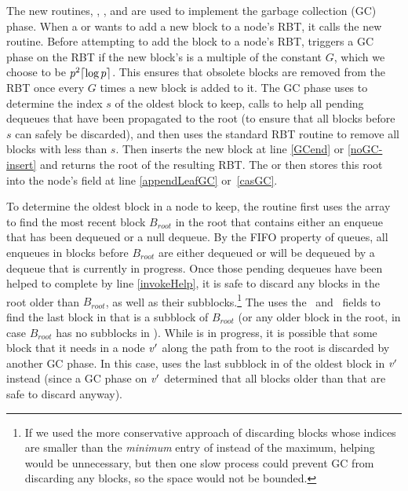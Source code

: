 The new routines, , ,  and  are
used to implement the garbage collection (GC) phase.
When a  or  wants to add a new block to a node's  RBT,
it calls the new  routine.
Before attempting to add the block to a node's RBT,  triggers a GC phase on the RBT if 
the new block's  is a multiple of the constant $G$, which we choose to be $p^2\lceil \log p \rceil$.
This ensures that obsolete blocks are removed from the RBT once every $G$ times a new block is added to it.
The GC phase uses  to determine the index $s$ of the oldest block to keep,
calls  to help all pending dequeues that have been propagated to the root
(to ensure that all blocks before $s$ can safely be discarded), and then
uses the standard RBT  routine \cite{Tar83}
to remove all blocks with  less than $s$.
Then 
inserts the new block at line \ref{GCend} or \ref{noGC-insert}
and returns the root of the resulting RBT.
The  or  then stores this root into the node's  field at line 
 \ref{appendLeafGC} or~\ref{casGC}.

To determine the oldest block in a node  to keep, the  routine  first
uses the  array to
find the most recent block $B_{root}$ in the root that contains either an enqueue that has been dequeued
or a null dequeue.  By the FIFO property of queues, all enqueues in blocks before $B_{root}$ are either
dequeued or will be dequeued by a dequeue that is currently in progress.  Once those pending dequeues have been
helped to complete by line \ref{invokeHelp},
it is safe to discard any blocks in the root older than $B_{root}$, as well
as their subblocks.\footnote{If we used the more conservative approach of discarding blocks whose indices 
are smaller than the \emph{minimum} entry of  instead of the maximum, helping would be unnecessary, but then one slow process could prevent GC from discarding any blocks, so the space would not be bounded.}
The  uses the \eleft\ and \eright\ fields to find the last block in  that is a subblock
of $B_{root}$ (or any older block in the root, in case $B_{root}$ has no subblocks in ).
While  is in progress, it is possible that some block that it needs in a node $\mbox{\textnormal{\textit{v}}}'$
along the path from  to the root is discarded by another GC phase.
In this case,  uses the last subblock in  of the oldest block in $\mbox{\textnormal{\textit{v}}}'$ instead
(since a GC phase on $\mbox{\textnormal{\textit{v}}}'$ determined that all blocks older than that are safe to discard anyway).

